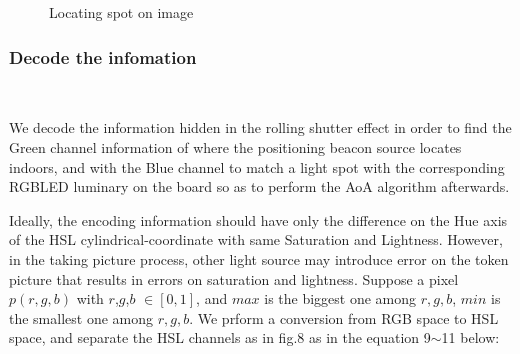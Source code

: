 \documentclass[conference]{IEEEtran}
\begin{document}
\begin{figure}
{	}
	\caption{Locating spot on image}
\end{figure}



\subsubsection{\textbf{Decode the infomation}} \ 

We decode the information hidden in the rolling shutter effect in order to find the Green channel information of where the positioning beacon source locates indoors, and with the Blue channel to match a light spot with the corresponding RGBLED luminary on the board so as to perform the AoA algorithm afterwards.

Ideally, the encoding information should have only the difference on the Hue axis of the HSL cylindrical-coordinate with same Saturation and Lightness. However, in the taking picture process, other light source may introduce error on the token picture that results in errors on saturation and lightness. Suppose a pixel $p(r,g,b)$ with $r$,$g$,$b$ $\in [0,1]$, and $max$ is the biggest one among $r,g,b$, $min$ is the smallest one among $r,g,b$. We prform a conversion from RGB space to HSL space, and separate the HSL channels as in fig.8 as in the equation 9$\sim$11 below: 
\end{document}

